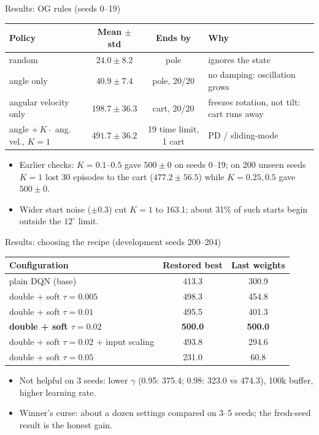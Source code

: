 \documentclass[aspectratio=169]{beamer}
\begin{document}
\begin{frame}{Results: OG rules (seeds 0--19)}
\small
\begin{table}
\centering
\begin{tabular}{lccl}
\toprule
\textbf{Policy} & \textbf{Mean $\pm$ std} & \textbf{Ends by} & \textbf{Why}\\
\midrule
random & $24.0\pm8.2$ & pole & ignores the state\\
angle only & $40.9\pm7.4$ & pole, 20/20 & no damping: oscillation grows\\
angular velocity only & $198.7\pm36.3$ & cart, 20/20 & freezes rotation, not tilt: cart runs away\\
angle $+\,K\cdot$ ang. vel., $K=1$ & $491.7\pm36.2$ & 19 time limit, 1 cart & PD / sliding-mode\\
\bottomrule
\end{tabular}
\end{table}
\begin{itemize}
  \item Earlier checks: $K=0.1$--$0.5$ gave $500\pm0$ on seeds 0--19; on 200 unseen seeds $K=1$ lost 30 episodes to the cart ($477.2\pm56.5$) while $K=0.25,0.5$ gave $500\pm0$.
  \item Wider start noise ($\pm0.3$) cut $K=1$ to 163.1; about 31\% of such starts begin outside the $12^\circ$ limit.
\end{itemize}
\end{frame}

\begin{frame}{Results: choosing the recipe (development seeds 200--204)}
\small
\begin{table}
\centering
\begin{tabular}{lcc}
\toprule
\textbf{Configuration} & \textbf{Restored best} & \textbf{Last weights}\\
\midrule
plain DQN (base) & 413.3 & 300.9\\
double + soft $\tau=0.005$ & 498.3 & 454.8\\
double + soft $\tau=0.01$ & 495.5 & 401.3\\
\textbf{double + soft $\tau=0.02$} & \textbf{500.0} & \textbf{500.0}\\
double + soft $\tau=0.02$ + input scaling & 493.8 & 294.6\\
double + soft $\tau=0.05$ & 231.0 & 60.8\\
\bottomrule
\end{tabular}
\end{table}
\begin{itemize}
  \item Not helpful on 3 seeds: lower $\gamma$ (0.95: 375.4; 0.98: 323.0 vs 474.3), 100k buffer, higher learning rate.
  \item \alert{Winner's curse}: about a dozen settings compared on 3--5 seeds; the fresh-seed result is the honest gain.
\end{itemize}
\end{frame}
\end{document}
